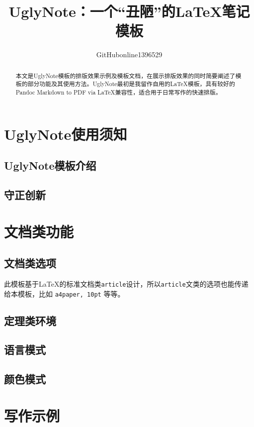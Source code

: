 \documentclass[12pt, blue]{uglynote}
\title{\bfseries UglyNote：一个“丑陋”的\LaTeX{}笔记模板}
\author{GitHubonline1396529}
\date{\zhdate{2022/12/31}}
\begin{document}
\maketitle
\begin{abstract}
    本文是UglyNote模板的排版效果示例及模板文档，在展示排版效果的同时简要阐述了模板的部分功能及其使用方法。UglyNote最初是我留作自用的\LaTeX 模板，具有较好的Pandoc Markdown to PDF via \LaTeX 兼容性，适合用于日常写作的快速排版。

\end{abstract}

\section{UglyNote使用须知}

\subsection{UglyNote模板介绍}



\subsection{守正创新}



\section{文档类功能}

\subsection{文档类选项}

此模板基于\LaTeX{}的标准文档类\texttt{article}设计，所以\texttt{article}文类的选项也能传递给本模板，比如 \texttt{a4paper, 10pt} 等等。



\subsection{定理类环境}



\subsection{语言模式}



\subsection{颜色模式}



\section{写作示例}


\end{document}
